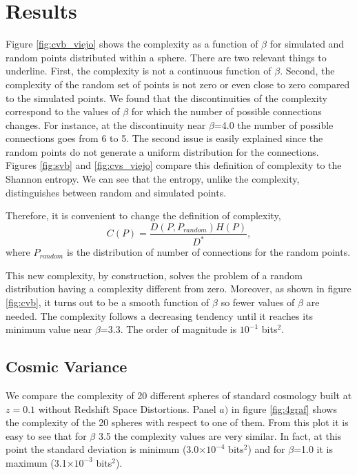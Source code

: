\documentclass[fleqn,usenatbib]{mnras}
\begin{document}
\section{Results}
\label{sec:results}

Figure \ref{fig:cvb_viejo} shows the complexity as a function of $\beta$ for simulated and random points distributed within a sphere. There are two relevant things to underline. First, the complexity is not a continuous function of $\beta$. Second, the complexity of the random set of points is not zero or even close to zero compared to the simulated points. We found that the discontinuities of the complexity correspond to the values of $\beta$ for which the number of possible connections changes. For instance, at the discontinuity near $\beta$=4.0 the number of possible connections goes from 6 to 5. The second issue is easily explained since the random points do not generate a uniform distribution for the connections. Figures \ref{fig:svb} and \ref{fig:cvs_viejo} compare this definition of complexity to the Shannon entropy. We can see that the entropy, unlike the complexity, distinguishes between random and simulated points. 

Therefore, it is convenient to change the definition of complexity,
\begin{equation}
    C(P)=\frac{D(P,P_{random})H(P)}{D^{*}},
    \label{eq:comp_def2}
\end{equation}
where $P_{random}$ is the distribution of number of connections for the random points.

This new complexity, by construction, solves the problem of a random distribution having a complexity different from zero. Moreover, as shown in figure \ref{fig:cvb}, it turns out to be a smooth function of $\beta$ so fewer values of $\beta$ are needed. The complexity follows a decreasing tendency until it reaches its minimum value near $\beta$=3.3. The order of magnitude is $10^{-1}$ bits$^{2}$.

\subsection{Cosmic Variance}

We compare the complexity of 20 different spheres of standard cosmology built at $z=0.1$ without Redshift Space Distortions. Panel $a)$ in figure \ref{fig:4graf} shows the complexity of the 20 spheres with respect to one of them. From this plot it is easy to see that for $\beta$ 3.5 the complexity values are very similar. In fact, at this point the standard deviation is minimum (3.0$\times10^{-4}$ bits$^{2}$) and for $\beta$=1.0 it is maximum (3.1$\times10^{-3}$ bits$^{2}$). 
\end{document}
